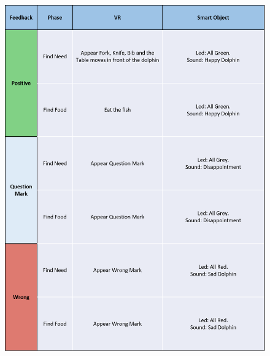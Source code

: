 \documentclass [12pt]{article}
\begin{document}
\begin{figure}[ht!]
\centering
\includegraphics[height=20cm,width=15cm]{FeedbackUX1.png}
\end{figure}

\clearpage
\end{document}
